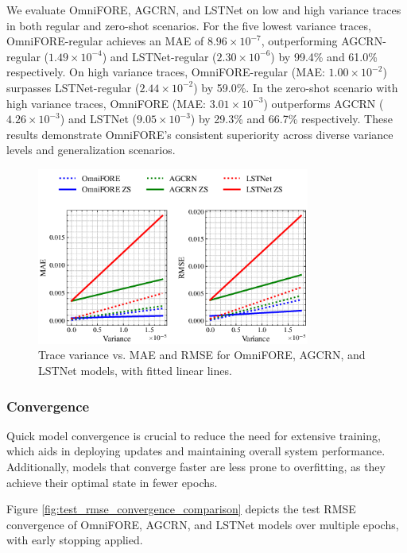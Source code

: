 \documentclass{ieeetmlcn}
\begin{document}
We evaluate OmniFORE, AGCRN, and LSTNet on low and high variance traces in both regular and zero-shot scenarios. For the five lowest variance traces, OmniFORE-regular achieves an MAE of $8.96 \times 10^{-7}$, outperforming AGCRN-regular ($1.49 \times 10^{-4}$) and LSTNet-regular ($2.30 \times 10^{-6}$) by 99.4\% and 61.0\% respectively. On high variance traces, OmniFORE-regular (MAE: $1.00 \times 10^{-2}$) surpasses LSTNet-regular ($2.44 \times 10^{-2}$) by 59.0\%. In the zero-shot scenario with high variance traces, OmniFORE (MAE: $3.01 \times 10^{-3}$) outperforms AGCRN ($4.26 \times 10^{-3}$) and LSTNet ($9.05 \times 10^{-3}$) by 29.3\% and 66.7\% respectively. These results demonstrate OmniFORE's consistent superiority across diverse variance levels and generalization scenarios.

\begin{figure}\centering
\centering
\centering\includegraphics[width=0.8\textwidth]{img/metrics_variance_comparison_fitted2.png}
\caption{Trace variance vs. MAE and RMSE for OmniFORE, AGCRN, and LSTNet models, with fitted linear lines.}
\label{fig:metrics_variance_comparison_fitted}
\end{figure}

\subsubsection{\textbf{Convergence}}

Quick model convergence is crucial to reduce the need for extensive training, which aids in deploying updates and maintaining overall system performance. Additionally, models that converge faster are less prone to overfitting, as they achieve their optimal state in fewer epochs.

Figure \ref{fig:test_rmse_convergence_comparison} depicts the test RMSE convergence of OmniFORE, AGCRN, and LSTNet models over multiple epochs, with early stopping applied.
\end{document}
